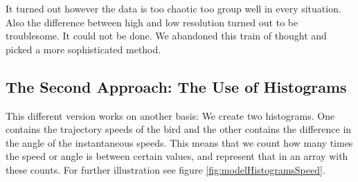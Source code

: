 It turned out however the data is too chaotic too group well in every situation. 
Also the difference between high and low resolution turned out to be troublesome. It
could not be done. We abandoned this train of thought and picked a more sophisticated 
method.




\subsection{The Second Approach: The Use of Histograms}
%
%
%

This different version works on another basis: We create two histograms. One
contains the trajectory speeds of the bird and the other contains the
difference in the angle of the instantaneous speeds. This means that we count
how many times the speed or angle is between certain values, and represent that
in an array with these counts. For further illustration see figure
\ref{fig:modelHistogramsSpeed}.


